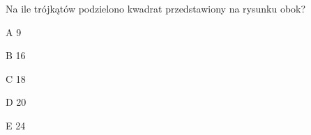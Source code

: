 \begin{tresc}
Na ile trójkątów podzielono kwadrat przedstawiony na rysunku obok?
\end{tresc}
\begin{wariant}{A} 9 \end{wariant}
\begin{wariant}{B} 16 \end{wariant}
\begin{wariant}{C} 18 \end{wariant}
\begin{wariant}{D} 20 \end{wariant}
\begin{wariant}{E} 24 \end{wariant}
